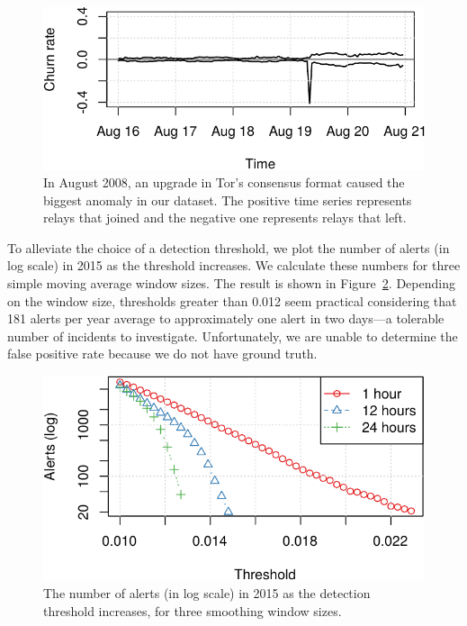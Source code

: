 \begin{figure}[t]
	\centering
	\includegraphics[width=\linewidth]{diagrams/2008-08.pdf}
	\caption{In August 2008, an upgrade in Tor's consensus format caused the
	biggest anomaly in our dataset.  The positive time series represents relays
	that joined and the negative one represents relays that left.}
	\label{fig:2008-08}
\end{figure}

To alleviate the choice of a detection threshold, we plot the number of alerts
(in log scale) in 2015 as the threshold increases.  We calculate these numbers
for three simple moving average window sizes.  The result is shown in
Figure~\ref{fig:threshold-alarm}.  Depending on the window size, thresholds
greater than 0.012 seem practical considering that 181 alerts per year average
to approximately one alert in two days---a tolerable number of incidents to
investigate.  Unfortunately, we are unable to determine the false positive rate
because we do not have ground truth.

\begin{figure}[t]
	\centering
	\includegraphics[width=0.9\linewidth]{diagrams/threshold-alarm.pdf}
	\caption{The number of alerts (in log scale) in 2015 as the detection
	threshold increases, for three smoothing window sizes.}
	\label{fig:threshold-alarm}
\end{figure}

